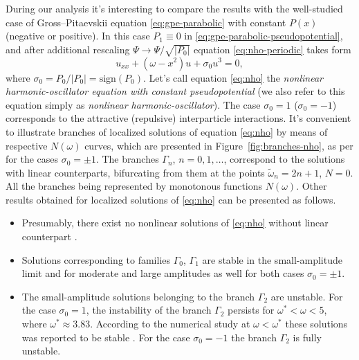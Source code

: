 During our analysis it's interesting to compare the results with the well-studied case of Gross--Pitaevskii equation \eqref{eq:gpe-parabolic} with constant $P(x)$ (negative or positive).
In this case $P_1 \equiv 0$ in \eqref{eq:gpe-parabolic-pseudopotential}, and after additional rescaling $\Psi \to \Psi / \sqrt{|P_0|}$ equation \eqref{eq:nho-periodic} takes form
\begin{equation}
	u_{xx} + (\omega - x^2) u + \sigma_0 u^3 = 0,
\label{eq:nho}
\end{equation}
where $\sigma_0 = P_0 / |P_0| = \mathrm{sign}(P_0)$.
Let's call equation \eqref{eq:nho} the {\it nonlinear harmonic-oscillator equation with constant pseudopotential} (we also refer to this equation simply as {\it nonlinear harmonic-oscillator}).
The case $\sigma_0 = 1$ ($\sigma_0 = -1$) corresponds to the attractive (repulsive) interparticle interactions.
It's convenient to illustrate branches of localized solutions of equation \eqref{eq:nho} by means of respective $N(\omega)$ curves, which are presented in Figure~\ref{fig:branches-nho}, as per \cite{ZezyulinAlfimovKonotopPerecGarcia2007, ZezyulinAlfimovKonotopPerecGarcia2008} for the cases $\sigma_0 = \pm 1$.
The branches $\Gamma_n$, $n = 0, 1, \dots$, correspond to the solutions with linear counterparts, bifurcating from them at the points $\tilde{\omega}_n = 2n + 1$, $N = 0$.
All the branches being represented by monotonous functions $N(\omega)$.
Other results obtained for localized solutions of \eqref{eq:nho} can be presented as follows.
\begin{itemize}
	\item Presumably, there exist no nonlinear solutions of \eqref{eq:nho} without linear counterpart \cite{AlfimovZezyulin}.
	\item Solutions corresponding to families $\Gamma_0$, $\Gamma_1$ are stable in the small-amplitude limit and for moderate and large amplitudes as well for both cases $\sigma_0 = \pm 1$.
	\item
		The small-amplitude solutions belonging to the branch $\Gamma_2$ are unstable.
		For the case $\sigma_0 = 1$, the instability of the branch $\Gamma_2$ persists for $\omega^* < \omega < 5$, where $\omega^* \approx 3.83$.
		According to the numerical study at $\omega < \omega^*$ these solutions was reported to be stable \cite{AlfimovZezyulin}.
		For the case $\sigma_0 = -1$ the branch $\Gamma_2$ is fully unstable. 
\end{itemize}

